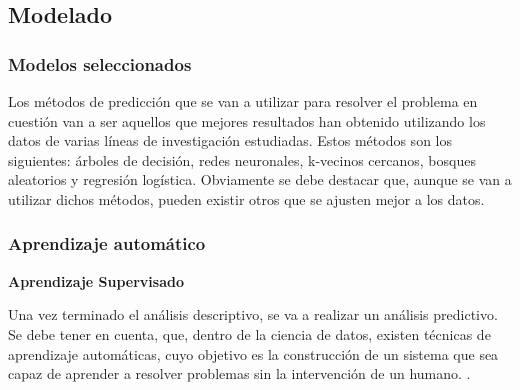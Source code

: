 

\subsection{Modelado}

\subsubsection{Modelos seleccionados}
Los métodos de predicción que se van a utilizar para resolver el problema en cuestión van a ser aquellos que mejores resultados han obtenido utilizando los datos de varias líneas de investigación estudiadas. Estos métodos son los siguientes: árboles de decisión, redes neuronales, k-vecinos cercanos, bosques aleatorios y regresión logística. Obviamente se debe destacar que, aunque se van a utilizar dichos métodos, pueden existir otros que se ajusten mejor a los datos.

\subsubsection{Aprendizaje automático}



\textbf{Aprendizaje Supervisado}

Una vez terminado el análisis descriptivo, se va a realizar un análisis predictivo. Se debe tener en cuenta, que, dentro de la ciencia de datos, existen técnicas de aprendizaje automáticas, cuyo objetivo es la construcción de un sistema que sea capaz de aprender a resolver problemas sin la intervención de un humano. \cite{MARIN2018}.

